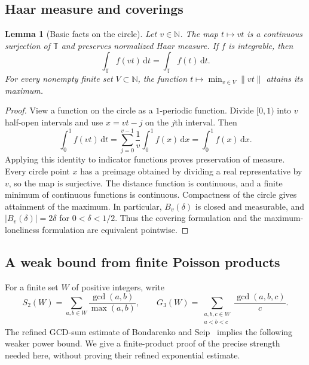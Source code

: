 \documentclass[12pt,leqno]{article}
\numberwithin{equation}{section}
\newtheorem{lemma}[theorem]{Lemma}
\theoremstyle{remark}
\newcommand{\LRtorus}{\mathbb T}
\newcommand{\LRnatural}{\mathbb N}
\newcommand{\LRdifferential}{\,\mathrm d}
\begin{document}
\subsection{Haar measure and coverings}
\begin{lemma}[Basic facts on the circle]\label{lem:circle}
Let $v\in\LRnatural$. The map $t\mapsto vt$ is a continuous surjection of $\LRtorus$ and preserves normalized Haar measure. If $f$ is integrable, then
\begin{equation}\label{eq:dilationintegral}
\int_{\LRtorus}f(vt)\LRdifferential t=\int_{\LRtorus}f(t)\LRdifferential t.
\end{equation}
For every nonempty finite set $V\subset\LRnatural$, the function $t\mapsto\min_{v\in V}\|vt\|$ attains its maximum.
\end{lemma}
\begin{proof}
View a function on the circle as a $1$-periodic function. Divide $[0,1)$ into $v$ half-open intervals and use $x=vt-j$ on the $j$th interval. Then
\[
\int_0^1f(vt)\LRdifferential t
=\sum_{j=0}^{v-1}\frac1v\int_0^1f(x)\LRdifferential x
=\int_0^1f(x)\LRdifferential x.
\]
Applying this identity to indicator functions proves preservation of measure. Every circle point $x$ has a preimage obtained by dividing a real representative by $v$, so the map is surjective. The distance function is continuous, and a finite minimum of continuous functions is continuous. Compactness of the circle gives attainment of the maximum. In particular, $B_v(\delta)$ is closed and measurable, and $|B_v(\delta)|=2\delta$ for $0<\delta<1/2$. Thus the covering formulation and the maximum-loneliness formulation are equivalent pointwise.
\end{proof}


\subsection{A weak bound from finite Poisson products}
For a finite set $W$ of positive integers, write
\begin{equation}\label{eq:gcds}
S_2(W)=\sum_{a,b\in W}\frac{\gcd(a,b)}{\max(a,b)},\qquad
G_3(W)=\sum_{\substack{a,b,c\in W\\a<b<c}}\frac{\gcd(a,b,c)}c.
\end{equation}
The refined GCD-sum estimate of Bondarenko and Seip~\cite{BS} implies the following weaker power bound. We give a finite-product proof of the precise strength needed here, without proving their refined exponential estimate.
\end{document}
